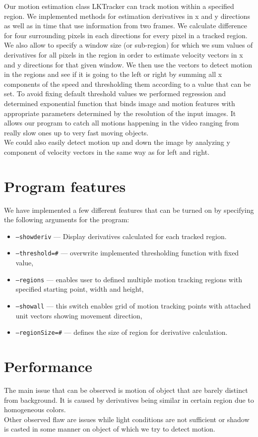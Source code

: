 \documentclass[12pt,a4paper,twocolumn]{article}
\begin{document}
Our motion estimation class LKTracker can track motion within a specified region. We implemented methods for estimation derivatives in x and y directions as well as in time that use information from two frames. We calculate difference for four 
surrounding pixels in each directions for every pixel in a tracked region. We also allow to specify a window size (or sub-region) for which we sum values of derivatives for all pixels
in the region in order to estimate velocity vectors in x and y directions for that given window. We then use the vectors to detect motion in the regions and see if it is going to the left or right by 
summing all x components of the speed and thresholding them according to a value that can be set.
To avoid fixing default threshold values we performed regression and determined exponential function that binds image and motion 
features with appropriate parameters determined by the resolution of the input images. It allows our program to catch all motions happening in the video ranging from really slow ones up to very 
fast moving objects.\\
We could also easily detect motion up and down the image by analyzing y component of velocity vectors in the same way as for left and right.

\section*{Program features}
We have implemented a few different features that can be turned on by specifying the following arguments for the program:
\begin{itemize}
\item \texttt{--showderiv} --- Display derivatives calculated for each tracked region.
\item \texttt{--threshold=\textit{\#}} --- overwrite implemented thresholding function with fixed value,
\item \texttt{--regions} --- enables user to defined multiple motion tracking regions with specified starting point, width and height,
\item \texttt{--showall} --- this switch enables grid of motion tracking points with attached unit vectors showing movement direction,
\item \texttt{--regionSize=\textit{\#}} --- defines the size of region for derivative calculation.
\end{itemize}

\section*{Performance}
The main issue that can be observed is motion of object that are barely distinct from background. It is caused by derivatives being similar in certain region due to homogeneous colors.\\
Other observed flaw are issues while light conditions are not sufficient or shadow is casted in some manner on object of which we try to detect motion.\\
\end{document}
